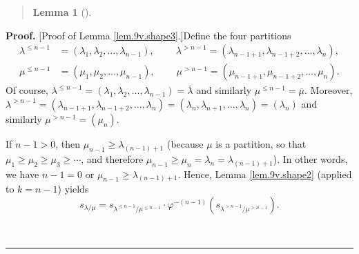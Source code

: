 \documentclass[numbers=enddot,12pt,final,onecolumn,notitlepage]{scrartcl}%
\newenvironment{statement}{\begin{quote}}{\end{quote}}
\theoremstyle{definition}
\newtheorem{lem}[theo]{Lemma}
\newenvironment{lemmain}[1][]
{\begin{statement}\begin{lem}[#1]}
{\end{lem}\end{statement}}
\newenvironment{proof}[1][Proof]{\noindent\textbf{#1.} }{\ \rule{0.5em}{0.5em}}
\newenvironment{lemmain}[1][Proof]{\noindent\textbf{#1.} }{\ \rule{0.5em}{0.5em}}
\begin{document}
\begin{enumerate}
\begin{lemmain}
\end{lemmain}

\begin{proof}
[Proof of Lemma \ref{lem.9v.shape3}.]Define the four partitions%
\begin{align*}
\lambda^{\leq n-1}  &  =\left(  \lambda_{1},\lambda_{2},\ldots,\lambda
_{n-1}\right)  ,\ \ \ \ \ \ \ \ \ \ \lambda^{>n-1}=\left(  \lambda
_{n-1+1},\lambda_{n-1+2},\ldots,\lambda_{n}\right)  ,\\
\mu^{\leq n-1}  &  =\left(  \mu_{1},\mu_{2},\ldots,\mu_{n-1}\right)
,\ \ \ \ \ \ \ \ \ \ \mu^{>n-1}=\left(  \mu_{n-1+1},\mu_{n-1+2},\ldots,\mu
_{n}\right)  .
\end{align*}
Of course, $\lambda^{\leq n-1}=\left(  \lambda_{1},\lambda_{2},\ldots
,\lambda_{n-1}\right)  =\overline{\lambda}$ and similarly $\mu^{\leq
n-1}=\overline{\mu}$. Moreover, $\lambda^{>n-1}=\left(  \lambda_{n-1+1}%
,\lambda_{n-1+2},\ldots,\lambda_{n}\right)  =\left(  \lambda_{n},\lambda
_{n+1},\ldots,\lambda_{n}\right)  =\left(  \lambda_{n}\right)  $ and similarly
$\mu^{>n-1}=\left(  \mu_{n}\right)  $.

If $n-1>0$, then $\mu_{n-1}\geq\lambda_{\left(  n-1\right)  +1}$ (because
$\mu$ is a partition, so that $\mu_{1}\geq\mu_{2}\geq\mu_{3}\geq\cdots$, and
therefore $\mu_{n-1}\geq\mu_{n}=\lambda_{n}=\lambda_{\left(  n-1\right)  +1}%
$). In other words, we have $n-1=0$ or $\mu_{n-1}\geq\lambda_{\left(
n-1\right)  +1}$. Hence, Lemma \ref{lem.9v.shape2} (applied to $k=n-1$) yields%
\begin{equation}
s_{\lambda/\mu}=s_{\lambda^{\leq n-1}/\mu^{\leq n-1}}\cdot\varphi^{-\left(
n-1\right)  }\left(  s_{\lambda^{>n-1}/\mu^{>n-1}}\right)  .
\label{pf.lem.9v.shape3.4}%
\end{equation}



\end{proof}
\end{enumerate}
\end{document}
